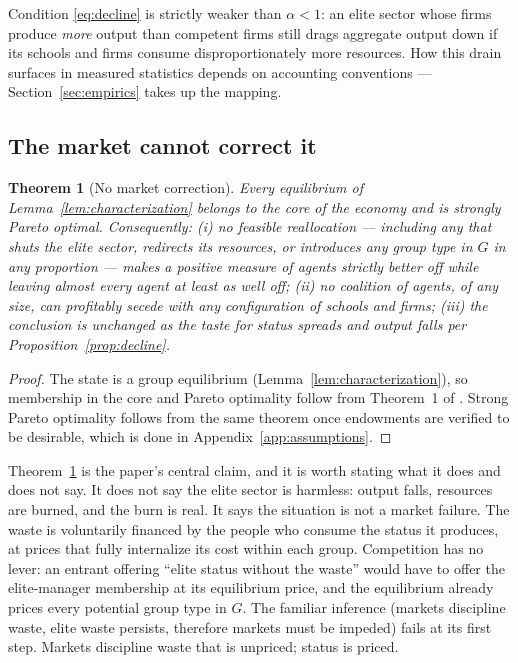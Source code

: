 \documentclass[12pt,letterpaper]{article}
\newtheorem{theorem}{Theorem}
\theoremstyle{definition}
\begin{document}
Condition \eqref{eq:decline} is strictly weaker than $\alpha<1$: an elite sector whose firms produce \emph{more} output than competent firms still drags aggregate output down if its schools and firms consume disproportionately more resources.
How this drain surfaces in measured statistics depends on accounting conventions --- Section~\ref{sec:empirics} takes up the mapping.

\subsection{The market cannot correct it}

\begin{theorem}[No market correction]\label{thm:nocorrection} Every equilibrium of Lemma~\ref{lem:characterization} belongs to the core of the economy and is strongly Pareto optimal.
Consequently: (i) no feasible reallocation --- including any that shuts the elite sector, redirects its resources, or introduces any group type in $G$ in any proportion --- makes a positive measure of agents strictly better off while leaving almost every agent at least as well off; (ii) no coalition of agents, of any size, can profitably secede with any configuration of schools and firms; (iii) the conclusion is unchanged as the taste for status spreads and output falls per Proposition~\ref{prop:decline}.
\end{theorem}

\begin{proof}
The state is a group equilibrium (Lemma~\ref{lem:characterization}), so membership in the core and Pareto optimality follow from Theorem~1 of \citet{ellickson2006organization}.
Strong Pareto optimality follows from the same theorem once endowments are verified to be desirable, which is done in Appendix~\ref{app:assumptions}.
\end{proof}

Theorem~\ref{thm:nocorrection} is the paper's central claim, and it is worth stating what it does and does not say.
It does not say the elite sector is harmless: output falls, resources are burned, and the burn is real.
It says the situation is not a market failure.
The waste is voluntarily financed by the people who consume the status it produces, at prices that fully internalize its cost within each group.
Competition has no lever: an entrant offering ``elite status without the waste'' would have to offer the elite-manager membership at its equilibrium price, and the equilibrium already prices every potential group type in $G$.
The familiar inference (markets discipline waste, elite waste persists, therefore markets must be impeded) fails at its first step.
Markets discipline waste that is unpriced; status is priced.
\end{document}
